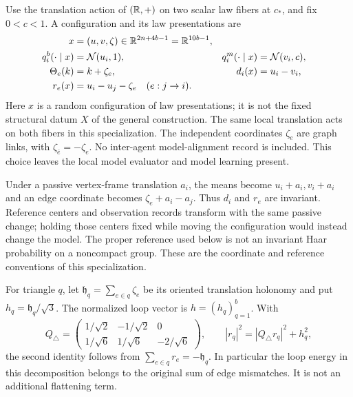 Use the translation action of \((\mathbb R,+)\) on two scalar law fibers at
\(c_*\), and fix \(0<c<1\). A configuration and its law presentations are
\begin{equation}
\begin{aligned}
x&=(u,v,\zeta)\in\mathbb R^{2n+4b-1}=\mathbb R^{10b-1},\\
q_i^b(\cdot\mid x)&=\mathcal N(u_i,1),&
q_i^m(\cdot\mid x)&=\mathcal N(v_i,c),\\
\Theta_e(k)&=k+\zeta_e,&
d_i(x)&=u_i-v_i,\\
r_e(x)&=u_i-u_j-\zeta_e\quad(e:j\to i).
\end{aligned}
\label{eq:rg-formation-configuration}
\end{equation}
Here \(x\) is a random configuration of law presentations; it is not the
fixed structural datum \(X\) of the general construction. The same local
translation acts on both fibers in this specialization. The independent
coordinates \(\zeta_e\) are graph links, with
\(\zeta_{\bar e}=-\zeta_e\). No inter-agent model-alignment record is
included. This choice leaves the local model evaluator and model learning
present. 

Under a passive vertex-frame translation \(a_i\), the means become
\(u_i+a_i,v_i+a_i\) and an edge coordinate becomes
\(\zeta_e+a_i-a_j\). Thus \(d_i\) and \(r_e\) are invariant. Reference
centers and observation records transform with the same passive change;
holding those centers fixed while moving the configuration would instead
change the model. The proper reference used below is not an invariant
Haar probability on a noncompact group. These are the coordinate and
reference conventions of this specialization. 

For triangle \(q\), let \(\mathfrak h_q=\sum_{e\in q}\zeta_e\) be its
oriented translation holonomy and put \(h_q=\mathfrak h_q/\sqrt3\).
The normalized loop vector is \(h=(h_q)_{q=1}^b\). With
\begin{equation}
Q_\triangle=
\begin{pmatrix}
1/\sqrt2&-1/\sqrt2&0\\
1/\sqrt6&1/\sqrt6&-2/\sqrt6
\end{pmatrix},
\qquad
|r_q|^2=|Q_\triangle r_q|^2+h_q^2,
\label{eq:rg-formation-loop-decomposition}
\end{equation}
the second identity follows from
\(\sum_{e\in q}r_e=-\mathfrak h_q\). In particular the loop energy
in this decomposition belongs to the original sum of edge mismatches.
It is not an additional flattening term. 

